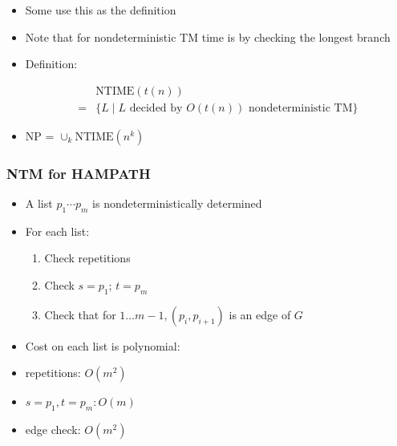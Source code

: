 \begin{frame}[allowframebreaks]
\begin{itemize}
\item Some use this as the definition

\item Note that for nondeterministic TM time is by checking the longest branch

\item Definition:

  \begin{equation*}
    \begin{split}
      & \text{NTIME}(t(n)) \\
      =& \{L\mid L
\text{ decided by } O(t(n))
\text{ nondeterministic TM}\}
\end{split}
\end{equation*}
\item NP = $\cup_k \text{NTIME}(n^k)$

\end{itemize}\end{frame} \begin{frame}[allowframebreaks] \frametitle{NTM for HAMPATH}
  \begin{itemize}
\item A list $p_1\cdots p_m$ is nondeterministically determined

\item For each list:

  \begin{enumerate}
  \item  Check repetitions
  \item Check $s=p_1$; $t=p_m$
\item Check that for $1 \ldots m-1, (p_i, p_{i+1})$ is an edge of $G$
  \end{enumerate}
\item Cost on each list is polynomial:

  
\item [] repetitions: $O(m^2)$

\item [] $s=p_1, t = p_m: O(m)$

\item [] edge check: $O(m^2)$

\end{itemize}\end{frame}



